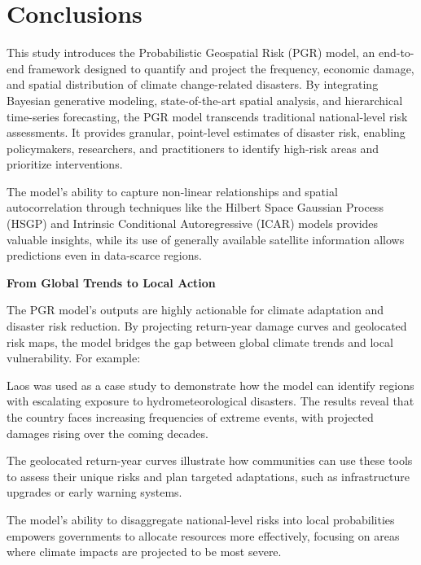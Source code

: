 
\section{Conclusions}
\label{sec:conclusions}

This study introduces the Probabilistic Geospatial Risk (PGR) model, an end-to-end framework designed to quantify and project the frequency, economic damage, and spatial distribution of climate change-related disasters. By integrating Bayesian generative modeling, state-of-the-art spatial analysis, and hierarchical time-series forecasting, the PGR model transcends traditional national-level risk assessments. It provides granular, point-level estimates of disaster risk, enabling policymakers, researchers, and practitioners to identify high-risk areas and prioritize interventions.

The model's ability to capture non-linear relationships and spatial autocorrelation through techniques like the Hilbert Space Gaussian Process (HSGP) and Intrinsic Conditional Autoregressive (ICAR) models provides valuable insights, while its use of generally available satellite information allows predictions even in data-scarce regions.

\textbf{From Global Trends to Local Action}

The PGR model's outputs are highly actionable for climate adaptation and disaster risk reduction. By projecting return-year damage curves and geolocated risk maps, the model bridges the gap between global climate trends and local vulnerability. For example:

Laos was used as a case study to demonstrate how the model can identify regions with escalating exposure to hydrometeorological disasters. The results reveal that the country faces increasing frequencies of extreme events, with projected damages rising over the coming decades.

The geolocated return-year curves illustrate how communities can use these tools to assess their unique risks and plan targeted adaptations, such as infrastructure upgrades or early warning systems.

The model's ability to disaggregate national-level risks into local probabilities empowers governments to allocate resources more effectively, focusing on areas where climate impacts are projected to be most severe.

